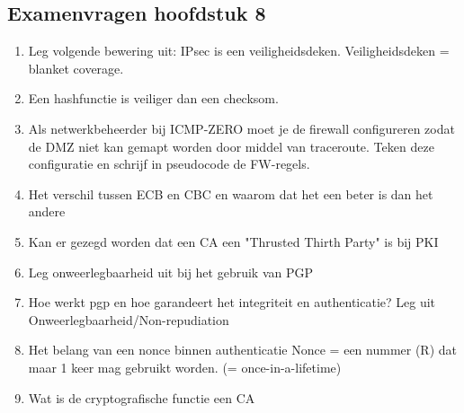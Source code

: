 \newpage
\subsection{Examenvragen hoofdstuk 8}

\begin{enumerate} %

    \item Leg volgende bewering uit: IPsec is een veiligheidsdeken.
Veiligheidsdeken = blanket coverage.


    \item Een hashfunctie is veiliger dan een checksom.
    

    \item Als netwerkbeheerder bij ICMP-ZERO moet je de firewall configureren zodat de DMZ niet kan gemapt worden door middel van traceroute. Teken deze configuratie en schrijf in pseudocode de FW-regels.
    

\item Het verschil tussen ECB en CBC en waarom dat het een beter is dan het andere


\item Kan er gezegd worden dat een CA een "Thrusted Thirth Party" is bij PKI


\item Leg onweerlegbaarheid uit bij het gebruik van PGP


\item Hoe werkt pgp en hoe garandeert het integriteit en authenticatie? Leg uit Onweerlegbaarheid/Non-repudiation


\item Het belang van een nonce binnen authenticatie
Nonce = een nummer (R) dat maar 1 keer mag gebruikt worden. (= once-in-a-lifetime)


\item Wat is de cryptografische functie een CA


\end{enumerate}
